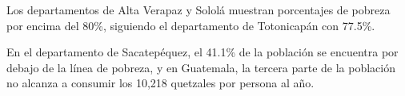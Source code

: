 Los departamentos de Alta Verapaz y Sololá muestran porcentajes de pobreza por encima del 80\%, siguiendo el departamento de Totonicapán con 77.5\%. 

En el departamento de Sacatepéquez, el 41.1\% de la población se encuentra por debajo de la línea de pobreza, y en Guatemala, la tercera parte de la población no alcanza a consumir los 10,218 quetzales por persona al año.